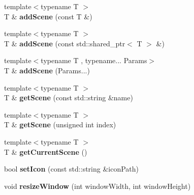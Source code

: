 \begin{DoxyCompactItemize}
\mbox{\label{classbkengine_1_1Game_ae10f3f55a157ea67aa44b2826d214757}} 
{\footnotesize template$<$typename T $>$ }\\T \& {\bfseries add\+Scene} (const T \&)
\item 
\mbox{\label{classbkengine_1_1Game_a42a7df337b004ba8e090c4cad4389565}} 
{\footnotesize template$<$typename T $>$ }\\T \& {\bfseries add\+Scene} (const std\+::shared\+\_\+ptr$<$ T $>$ \&)
\item 
\mbox{\label{classbkengine_1_1Game_af3c7c7aa11150d386c45e8085f2407d7}} 
{\footnotesize template$<$typename T , typename... Params$>$ }\\T \& {\bfseries add\+Scene} (Params...)
\item 
\mbox{\label{classbkengine_1_1Game_a7f20847c5da4e2ddd51273519e11df16}} 
{\footnotesize template$<$typename T $>$ }\\T \& {\bfseries get\+Scene} (const std\+::string \&name)
\item 
\mbox{\label{classbkengine_1_1Game_aa7a913a564504cbcaf7c7d442d1fea92}} 
{\footnotesize template$<$typename T $>$ }\\T \& {\bfseries get\+Scene} (unsigned int index)
\item 
\mbox{\label{classbkengine_1_1Game_a719d3981be6fa96b07310346311c2413}} 
{\footnotesize template$<$typename T $>$ }\\T \& {\bfseries get\+Current\+Scene} ()
\item 
\mbox{\label{classbkengine_1_1Game_a5b1374495ef9f549c88251d3d930cc12}} 
bool {\bfseries set\+Icon} (const std\+::string \&icon\+Path)
\item 
\mbox{\label{classbkengine_1_1Game_a7494363174008a772d245c20f31b2a19}} 
void {\bfseries resize\+Window} (int window\+Width, int window\+Height)
\item 
\mbox{\label{classbkengine_1_1Game_a2a253152712dc78d5f280badeb34ce3c}} 

\end{DoxyCompactItemize}

